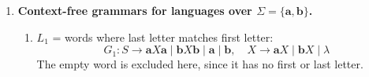 \begin{enumerate}[{8.}1. ]
\begin{enumerate}
\begin{enumerate}
\item Figure~8.5(d):
\[
\begin{aligned}
Z&\to S_0\\
S_0&\to \pmb{a}S_1\\
S_1&\to \pmb{a}S_2\mid \pmb{b}S_3\\
S_2&\to \lambda\\
S_3&\to \pmb{b}S_1.
\end{aligned}
\]

\item Figure~8.5(e):
\[
\begin{aligned}
Z&\to S_1\mid S_2\\
S_1&\to \pmb{a}S_1\mid \pmb{a}S_2\\
S_2&\to \pmb{a}S_1\mid \pmb{b}S_1\mid \lambda.
\end{aligned}
\]

\item Figure~8.5(f):
\[
\begin{aligned}
Z&\to S_0\\
S_0&\to \pmb{a}S_1\\
S_1&\to S_0\mid \pmb{b}S_2\\
S_2&\to \pmb{c}S_3\\
S_3&\to S_1\mid \lambda.
\end{aligned}
\]

\item Figure~8.5(g):
\[
\begin{aligned}
Z&\to S_0\\
S_0&\to \pmb{a}S_1\mid \lambda\\
S_1&\to \pmb{a}S_0\mid \pmb{b}S_3\mid \pmb{c}S_2\\
S_2&\to \pmb{c}S_1\\
S_3&\to \pmb{b}S_1.
\end{aligned}
\]
\end{enumerate}
\end{enumerate}

\item \textbf{Context-free grammars for languages over $\Sigma=\{\pmb{a},\pmb{b}\}$.}

\begin{enumerate}
\item $L_1$ = words where last letter matches first letter:
\[
G_1: S \to \pmb{a}X\pmb{a} \mid \pmb{b}X\pmb{b} \mid \pmb{a} \mid \pmb{b}, \quad X \to \pmb{a}X \mid \pmb{b}X \mid \lambda
\]
The empty word is excluded here, since it has no first or last letter.


\end{enumerate}
\end{enumerate}

